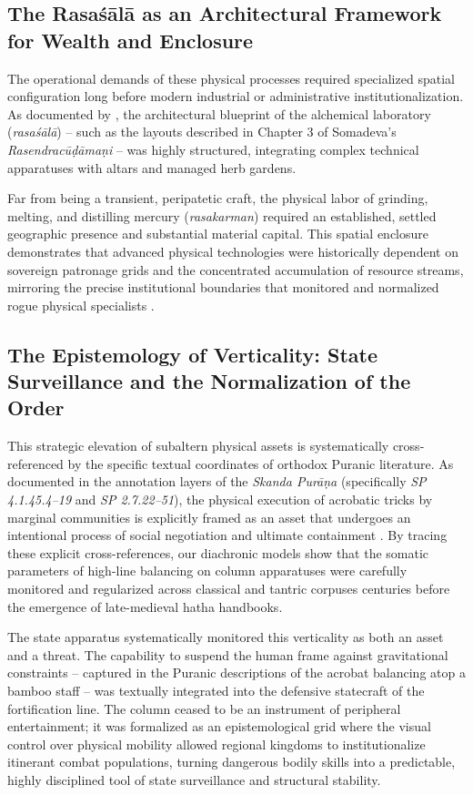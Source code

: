 \documentclass[11pt,twoside,letterpaper]{article}
\begin{document}
\subsection{The Rasa\'s\={a}l\={a} as an Architectural Framework for Wealth and Enclosure}
The operational demands of these physical processes required specialized spatial configuration long before modern industrial or administrative institutionalization. As documented by \citet{Wujastyk2025}, the architectural blueprint of the alchemical laboratory (\textit{rasa\'s\={a}l\={a}}) -- such as the layouts described in Chapter 3 of Somadeva’s \textit{Rasendrac\={u}\d{d}\={a}ma\d{n}i} -- was highly structured, integrating complex technical apparatuses with altars and managed herb gardens.

Far from being a transient, peripatetic craft, the physical labor of grinding, melting, and distilling mercury (\textit{rasakarman}) required an established, settled geographic presence and substantial material capital. This spatial enclosure demonstrates that advanced physical technologies were historically dependent on sovereign patronage grids and the concentrated accumulation of resource streams, mirroring the precise institutional boundaries that monitored and normalized rogue physical specialists \citep{Wujastyk2025}.

\subsection{The Epistemology of Verticality: State Surveillance and the Normalization of the Order}
This strategic elevation of subaltern physical assets is systematically cross-referenced by the specific textual coordinates of orthodox Puranic literature. As documented in the annotation layers of the \textit{Skanda Pur\={a}\d{n}a} (specifically \textit{SP 4.1.45.4–19} and \textit{SP 2.7.22–51}), the physical execution of acrobatic tricks by marginal communities is explicitly framed as an asset that undergoes an intentional process of social negotiation and ultimate containment \citep{Shastri1991}. By tracing these explicit cross-references, our diachronic models show that the somatic parameters of high-line balancing on column apparatuses were carefully monitored and regularized across classical and tantric corpuses centuries before the emergence of late-medieval hatha handbooks.

The state apparatus systematically monitored this verticality as both an asset and a threat. The capability to suspend the human frame against gravitational constraints – captured in the Puranic descriptions of the acrobat balancing atop a bamboo staff – was textually integrated into the defensive statecraft of the fortification line. The column ceased to be an instrument of peripheral entertainment; it was formalized as an epistemological grid where the visual control over physical mobility allowed regional kingdoms to institutionalize itinerant combat populations, turning dangerous bodily skills into a predictable, highly disciplined tool of state surveillance and structural stability.
\end{document}
